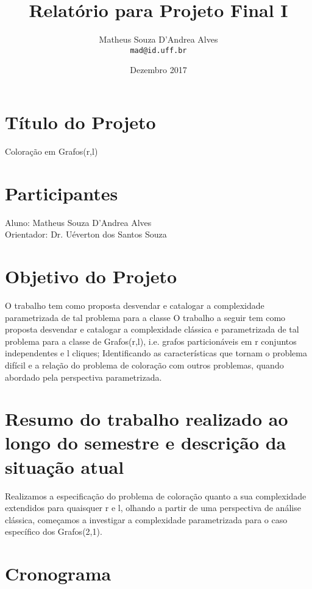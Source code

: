 \documentclass{article}
\title{Relatório para Projeto Final I}
\author{
    Matheus Souza D'Andrea Alves \\
    \texttt{mad@id.uff.br}
}
\date{Dezembro 2017}
\begin{document}
\maketitle

\section{Título do Projeto}
Coloração em Grafos(r,l)

\section{Participantes}

Aluno: Matheus Souza D'Andrea Alves
\\
Orientador: Dr. Uéverton dos Santos Souza

\section{Objetivo do Projeto}

O trabalho tem como proposta desvendar e catalogar a complexidade parametrizada de tal problema para a classe O trabalho a seguir tem como proposta desvendar e catalogar a complexidade clássica e parametrizada de tal problema para a classe de Grafos(r,l), i.e. grafos particionáveis em r conjuntos independentes e l cliques; Identificando as características que tornam o problema difícil e a relação do problema de coloração com outros problemas, quando abordado pela perspectiva parametrizada.

\section{Resumo do trabalho realizado ao longo do semestre e descrição da situação atual}

Realizamos a especificação do problema de coloração quanto a sua complexidade extendidos para quaisquer r e l, olhando a partir de uma perspectiva de análise clássica, começamos a investigar a complexidade parametrizada para o caso específico dos Grafos(2,1).

\section{Cronograma}
\end{document}

